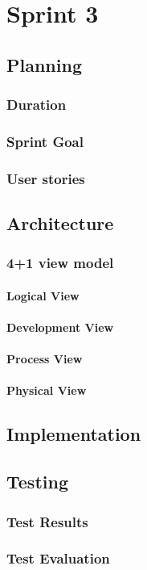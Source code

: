 \chapter{Sprint 3}
\section{Planning}
\subsection{Duration}
\subsection{Sprint Goal}
\subsection{User stories}
\section{Architecture}
\subsection{4+1 view model}
\subsubsection{Logical View}
\subsubsection{Development View}
\subsubsection{Process View}
\subsubsection{Physical View}
\section{Implementation}
\section{Testing}
\subsection{Test Results}
\subsection{Test Evaluation}
